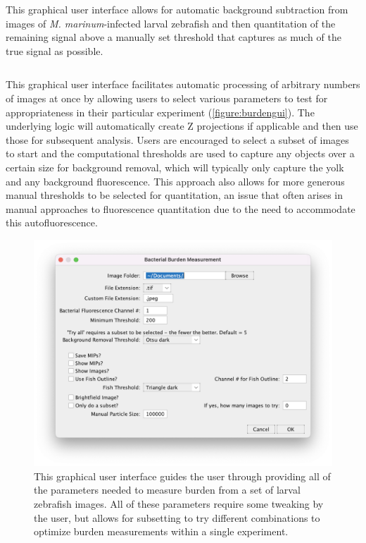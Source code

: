 \begin{code}
\caption{This graphical user interface allows for automatic background subtraction from images of \textit{M. marinum}-infected larval zebrafish and then quantitation of the remaining signal above a manually set threshold that captures as much of the true signal as possible.}
\label{burden}

\inputminted[breaklines,frame=single,fontsize=\small]{python}{source/burdenMeasurer.py}

\end{code}

This graphical user interface facilitates automatic processing of arbitrary numbers of images at once by allowing users to select various parameters to test for appropriateness in their particular experiment (\autoref{figure:burdengui}). The underlying logic will automatically create Z projections if applicable and then use those for subsequent analysis. Users are encouraged to select a subset of images to start and the computational thresholds are used to capture any objects over a certain size for background removal, which will typically only capture the yolk and any background fluorescence. This approach also allows for more generous manual thresholds to be selected for quantitation, an issue that often arises in manual approaches to fluorescence quantitation due to the need to accommodate this autofluorescence. 

\begin{figure}
\centering
\includegraphics[width=\textwidth]{images/burden_gui.png}
\caption{This graphical user interface guides the user through providing all of the parameters needed to measure burden from a set of larval zebrafish images. All of these parameters require some tweaking by the user, but allows for subsetting to try different combinations to optimize burden measurements within a single experiment.}
\label{figure:burdengui}
\end{figure}

